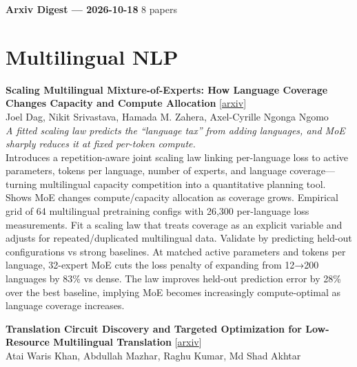 \documentclass[12pt,letterpaper]{article}
\begin{document}
{\footnotesize\textbf{Arxiv Digest --- 2026-10-18} \hfill 8 papers}

\smallskip

\section*{Multilingual NLP}

{\small\textbf{Scaling Multilingual Mixture-of-Experts: How Language Coverage Changes Capacity and Compute Allocation}} {\scriptsize[\href{https://arxiv.org/abs/2610.20247}{arxiv}]}\\
{\scriptsize Joel Dag, Nikit Srivastava, Hamada M. Zahera, Axel-Cyrille Ngonga Ngomo}\\

{\small\textit{A fitted scaling law predicts the ``language tax'' from adding languages, and MoE sharply reduces it at fixed per-token compute.}}\\[1pt]
{\footnotesize Introduces a repetition-aware joint scaling law linking per-language loss to active parameters, tokens per language, number of experts, and language coverage---turning multilingual capacity competition into a quantitative planning tool. Shows MoE changes compute/capacity allocation as coverage grows. Empirical grid of 64 multilingual pretraining configs with 26,300 per-language loss measurements. Fit a scaling law that treats coverage as an explicit variable and adjusts for repeated/duplicated multilingual data. Validate by predicting held-out configurations vs strong baselines. At matched active parameters and tokens per language, 32-expert MoE cuts the loss penalty of expanding from 12→200 languages by 83\% vs dense. The law improves held-out prediction error by 28\% over the best baseline, implying MoE becomes increasingly compute-optimal as language coverage increases.}

\medskip

{\small\textbf{Translation Circuit Discovery and Targeted Optimization for Low-Resource Multilingual Translation}} {\scriptsize[\href{https://arxiv.org/abs/2610.21456}{arxiv}]}\\
{\scriptsize Atai Waris Khan, Abdullah Mazhar, Raghu Kumar, Md Shad Akhtar}\\
\end{document}
